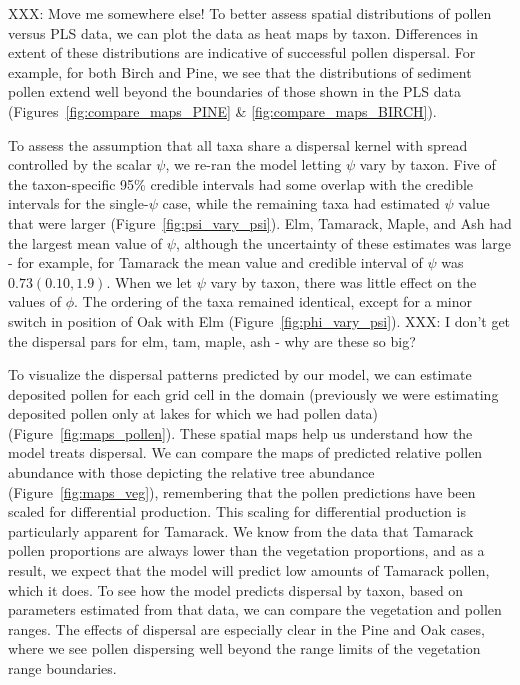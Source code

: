 \documentclass[12pt]{article}
\begin{document}


XXX: Move me somewhere else!
To better assess spatial distributions of pollen versus PLS data, we
can plot the data as heat maps by taxon. Differences in extent of these
distributions are indicative of successful pollen dispersal. For
example, for both Birch and Pine, we see that the distributions of
sediment pollen extend well beyond the boundaries of those shown in the PLS
data (Figures~\ref{fig:compare_maps_PINE} \& \ref{fig:compare_maps_BIRCH}). 

To assess the assumption that all taxa share a dispersal kernel with
spread controlled by the scalar $\psi$, we re-ran the model letting
$\psi$ vary by taxon. Five of the taxon-specific 95\% credible
intervals had some overlap with the credible intervals for the
single-$\psi$ case, while the remaining taxa had estimated $\psi$
value that were larger (Figure~\ref{fig:psi_vary_psi}). Elm, Tamarack,
Maple, and Ash had the largest mean value of $\psi$, although the
uncertainty of these estimates was large - for example, for Tamarack
the mean value and credible interval of $\psi$ was $0.73 (0.10,
1.9)$. When we let $\psi$ vary by taxon, there was little effect on
the values of $\phi$. The ordering of the taxa remained identical,
except for a minor switch in position of Oak with Elm
(Figure~\ref{fig:phi_vary_psi}). XXX: I don't get the dispersal pars
for elm, tam, maple, ash - why are these so big?



To visualize the dispersal patterns predicted by our model, we can
estimate deposited pollen for each grid cell in the domain (previously
we were estimating deposited pollen only at lakes for which we had
pollen data) (Figure~\ref{fig:maps_pollen}). These spatial maps help
us understand how the model treats dispersal. We can compare the maps
of predicted relative pollen abundance with those depicting the
relative tree abundance (Figure~\ref{fig:maps_veg}), remembering that the pollen predictions have
been scaled for differential production. This scaling for differential
production is particularly apparent for Tamarack. We know from the
data that Tamarack pollen proportions are always lower than the
vegetation proportions, and as a result, we expect that the model will
predict low amounts of Tamarack pollen, which it does. To see how the
model predicts dispersal by taxon, based on parameters estimated from
that data, we can compare the vegetation and pollen ranges. The
effects of dispersal are especially clear in the Pine and Oak cases,
where we see pollen dispersing well beyond the range limits of the
vegetation range boundaries.







\end{document}
